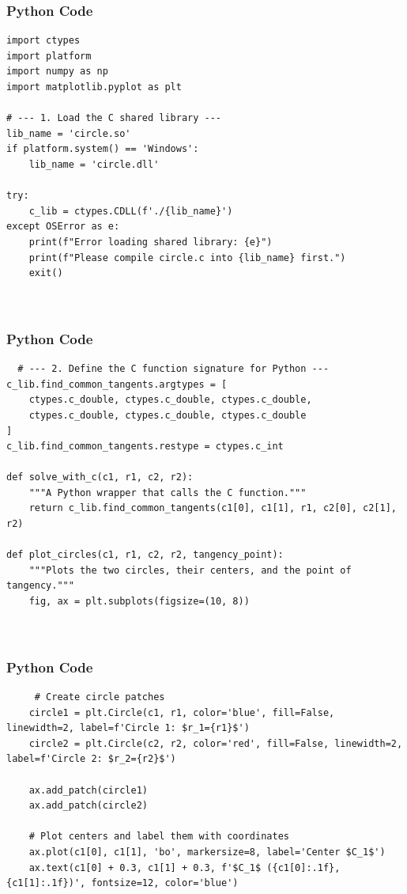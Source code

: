 \documentclass{beamer}
\begin{document}
   
    
    \begin{frame}[fragile]
        \frametitle{Python Code}
        \begin{lstlisting}
import ctypes
import platform
import numpy as np
import matplotlib.pyplot as plt

# --- 1. Load the C shared library ---
lib_name = 'circle.so'
if platform.system() == 'Windows':
    lib_name = 'circle.dll'

try:
    c_lib = ctypes.CDLL(f'./{lib_name}')
except OSError as e:
    print(f"Error loading shared library: {e}")
    print(f"Please compile circle.c into {lib_name} first.")
    exit()



        \end{lstlisting}
    \end{frame}
    
    \begin{frame}[fragile]
        \frametitle{Python Code}
        \begin{lstlisting}
  # --- 2. Define the C function signature for Python ---
c_lib.find_common_tangents.argtypes = [
    ctypes.c_double, ctypes.c_double, ctypes.c_double,
    ctypes.c_double, ctypes.c_double, ctypes.c_double
]
c_lib.find_common_tangents.restype = ctypes.c_int

def solve_with_c(c1, r1, c2, r2):
    """A Python wrapper that calls the C function."""
    return c_lib.find_common_tangents(c1[0], c1[1], r1, c2[0], c2[1], r2)

def plot_circles(c1, r1, c2, r2, tangency_point):
    """Plots the two circles, their centers, and the point of tangency."""
    fig, ax = plt.subplots(figsize=(10, 8))

   
        \end{lstlisting}
    \end{frame}
    
    \begin{frame}[fragile]
        \frametitle{Python Code}
        \begin{lstlisting}
     # Create circle patches
    circle1 = plt.Circle(c1, r1, color='blue', fill=False, linewidth=2, label=f'Circle 1: $r_1={r1}$')
    circle2 = plt.Circle(c2, r2, color='red', fill=False, linewidth=2, label=f'Circle 2: $r_2={r2}$')

    ax.add_patch(circle1)
    ax.add_patch(circle2)

    # Plot centers and label them with coordinates
    ax.plot(c1[0], c1[1], 'bo', markersize=8, label='Center $C_1$')
    ax.text(c1[0] + 0.3, c1[1] + 0.3, f'$C_1$ ({c1[0]:.1f}, {c1[1]:.1f})', fontsize=12, color='blue')
    
   
        \end{lstlisting}
    \end{frame}
    
\end{document}
